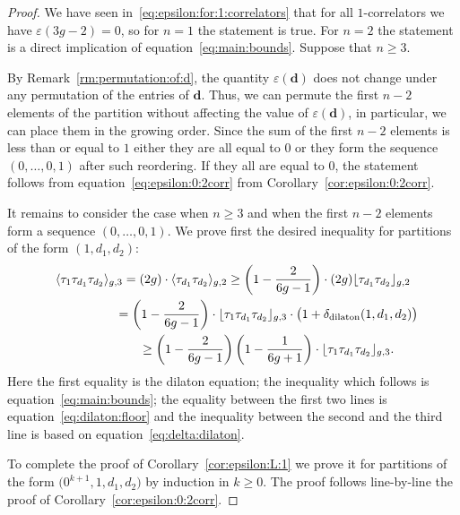 \documentclass[pdftex]{sigma}
\renewcommand{\epsilon}{\varepsilon}
\theoremstyle{definition}
\begin{document}
\begin{proof}We have seen in~\eqref{eq:epsilon:for:1:correlators}
that for all $1$-correlators we have
$\epsilon(3g-2)=0$,
so for $n=1$ the statement is true.
For $n=2$ the statement is a direct implication
of equation~\eqref{eq:main:bounds}.
Suppose that $n\ge 3$.

By Remark~\ref{rm:permutation:of:d}, the quantity
$\epsilon(\boldsymbol{d})$ does not change under any permutation of the entries of $\boldsymbol{d}$. Thus, we can permute the first $n-2$ elements of the partition without affecting the value of $\epsilon(\boldsymbol{d})$, in particular, we can place them in the growing order. Since the sum of the first $n-2$
elements is less than or equal to $1$ either they are all
equal to $0$ or they form the sequence $(0,\dots,0,1)$
after such reordering. If they all are equal to $0$, the
statement follows from equation~\eqref{eq:epsilon:0:2corr}
from Corollary~\eqref{cor:epsilon:0:2corr}.

It remains to consider the case when $n\ge 3$ and when the first $n-2$ elements form a sequence $(0,\dots,0,1)$. We prove first the desired inequality for partitions of the form $(1,d_1,d_2)$:
\begin{gather*}
\langle \tau_1\tau_{d_1}\tau_{d_2}\rangle_{g,3}
=(2g)\cdot\langle \tau_{d_1} \tau_{d_2}\rangle_{g,2}
\ge\left(1-\frac{2}{6g-1}\right)\cdot
(2g)\lfloor \tau_{d_1}\tau_{d_2}\rfloor_{g,2}
\\
\hphantom{\langle \tau_1\tau_{d_1}\tau_{d_2}\rangle_{g,3}}{}
=\left(1-\frac{2}{6g-1}\right)\cdot
\lfloor \tau_1\tau_{d_1}\tau_{d_2}\rfloor_{g,3}
\cdot\big(1+\delta_{\rm dilaton}(1,d_1,d_2)\big)
\\
\hphantom{\langle \tau_1\tau_{d_1}\tau_{d_2}\rangle_{g,3}}{}
\ge\left(1-\frac{2}{6g-1}\right)\left(1-\frac{1}{6g+1}\right)
\cdot\lfloor \tau_1\tau_{d_1}\tau_{d_2}\rfloor_{g,3} .
\end{gather*}
Here the first equality is the dilaton equation;
the inequality which follows is
equation~\eqref{eq:main:bounds}; the equality
between the first two lines is equation~\eqref{eq:dilaton:floor}
and the inequality between the second and the third line
is based on equation~\eqref{eq:delta:dilaton}.

To complete the proof of Corollary~\ref{cor:epsilon:L:1} we prove it for partitions of the form
$\big(0^{k+1},1,d_1,d_2\big)$ by induction in $k\ge 0$. The proof follows line-by-line the proof of Corollary~\ref{cor:epsilon:0:2corr}.
\end{proof}
\end{document}
